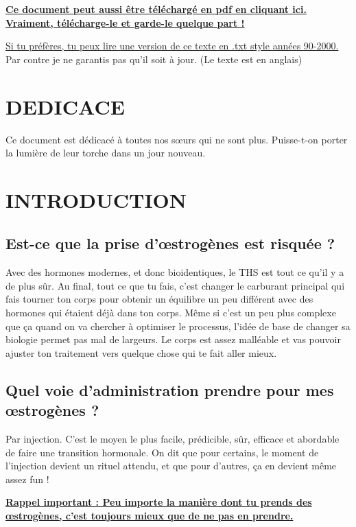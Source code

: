 \documentclass{article}
\begin{document}
\noindent\textbf{\href{PDF_LINK}{Ce document peut aussi être téléchargé en pdf en cliquant ici. Vraiment, télécharge-le et garde-le quelque part !}}

\noindent\href{https://pghrt.diy/pghrtgretchensversion.txt}{Si tu préfères, tu peux lire une version de ce texte en .txt style années 90-2000.} Par contre je ne garantis pas qu'il soit à jour. (Le texte est en anglais)



\section*{DEDICACE}

Ce document est dédicacé à toutes nos sœurs qui ne sont plus. Puisse-t-on porter la lumière de leur torche dans un jour nouveau.

\section{INTRODUCTION}

\subsection{Est-ce que la prise d'œstrogènes est risquée ?}

Avec des hormones modernes, et donc bioidentiques, le THS est tout ce qu'il y a de plus sûr. Au final, tout ce que tu fais, c'est changer le carburant principal qui fais tourner ton corps pour obtenir un équilibre un peu différent avec des hormones qui étaient déjà dans ton corps. Même si c'est un peu plus complexe que ça quand on va chercher à optimiser le processus, l'idée de base de changer sa biologie permet pas mal de largeurs. Le corps est assez malléable et vas pouvoir ajuster ton traitement vers quelque chose qui te fait aller mieux.

\subsection{Quel voie d'administration prendre pour mes œstrogènes ?}

Par injection. C'est le moyen le plus facile, prédicible, sûr, efficace et abordable de faire une transition hormonale. On dit que pour certains, le moment de l'injection devient un rituel attendu, et que pour d'autres, ça en devient même assez fun !  

\noindent\underline{\textbf{Rappel important : Peu importe la manière dont tu prends des œstrogènes, c'est toujours mieux que de ne pas en prendre.}}
\end{document}
